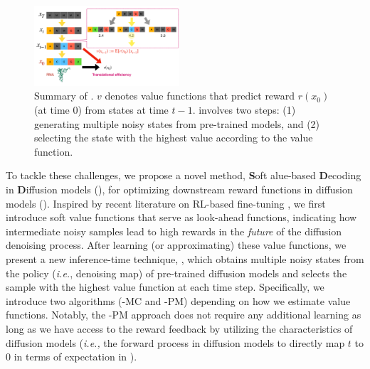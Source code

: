 \begin{figure}
\includegraphics[width=0.48\textwidth]{images/Materials_up.pdf}
\caption{Summary of \alg. $v$ denotes value functions that predict reward $r(x_0)$ (at time $0$) from states at time $t-1$. {\alg} involves two steps: (1) generating multiple noisy states from pre-trained models, and (2) selecting the state with the highest value according to the value function.}
\label{fig:decoding}
\end{figure}



To tackle these challenges, we propose a novel method, \textbf{S}oft alue-based \textbf{D}ecoding in \textbf{D}iffusion models (\alg), for optimizing downstream reward functions in diffusion models (). Inspired by recent literature on RL-based fine-tuning \citep{uehara2024understanding}, we first introduce soft value functions that serve as look-ahead functions, indicating how intermediate noisy samples lead to high rewards in the \emph{future} of the diffusion denoising process.
After learning (or approximating) these value functions, we present a new inference-time technique, \alg, which obtains multiple noisy states from the policy (\textit{i.e.}, denoising map) of pre-trained diffusion models and selects the sample with the highest value function at each time step. Specifically, we introduce two algorithms (\alg-MC and \alg-PM) depending on how we estimate value functions. Notably, the \alg-PM approach does not require any additional learning as long as we have access to the reward feedback by utilizing the characteristics of diffusion models { (\textit{i.e.,} the forward process in diffusion models to directly map $t$ to $0$ in terms of expectation in ). }
  

